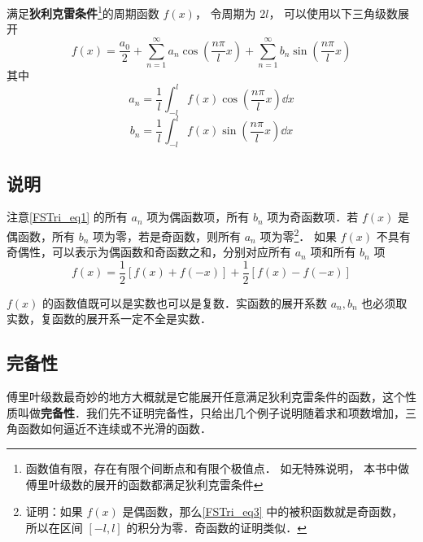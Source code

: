 


满足\textbf{狄利克雷条件}\footnote{函数值有限，存在有限个间断点和有限个极值点． 如无特殊说明， 本书中做傅里叶级数的展开的函数都满足狄利克雷条件}的周期函数 $f(x)$， 令周期为 $2l$， 可以使用以下三角级数展开
\begin{equation}\label{FSTri_eq1}
f( x ) = \frac{a_0}{2} + \sum_{n = 1}^\infty a_n \cos (\frac{n\pi}{l}x) + \sum_{n = 1}^\infty b_n \sin (\frac{n\pi}{l}x)
\end{equation}
其中
\begin{equation}\label{FSTri_eq2}
a_n = \frac{1}{l} \int_{ - l}^l f( x )\cos(\frac{n\pi}{l}x) \dd{x} 
\end{equation}
\begin{equation}\label{FSTri_eq3}
b_n = \frac{1}{l} \int_{ - l}^l f( x )\sin(\frac{n\pi}{l}x) \dd{x}
\end{equation}

\subsection{说明}
注意\autoref{FSTri_eq1} 的所有 $a_n$ 项为偶函数项，所有 $b_n$ 项为奇函数项．若 $f(x)$ 是偶函数，所有 $b_n$ 项为零，若是奇函数，则所有 $a_n$ 项为零\footnote{证明：如果 $f(x)$ 是偶函数，那么\autoref{FSTri_eq3} 中的被积函数就是奇函数， 所以在区间 $[-l,l]$ 的积分为零．奇函数的证明类似．}． 如果 $f(x)$ 不具有奇偶性，可以表示为偶函数和奇函数之和，分别对应所有 $a_n$ 项和所有 $b_n$ 项
\begin{equation}
f(x) = \frac12 [f(x)+f(-x)] + \frac12 [f(x)-f(-x)]
\end{equation}

$f(x)$ 的函数值既可以是实数也可以是复数．实函数的展开系数 $a_n, b_n$ 也必须取实数，复函数的展开系一定不全是实数．

\subsection{完备性}
傅里叶级数最奇妙的地方大概就是它能展开任意满足狄利克雷条件的函数，这个性质叫做\textbf{完备性}．我们先不证明完备性，只给出几个例子说明随着求和项数增加，三角函数如何逼近不连续或不光滑的函数．

